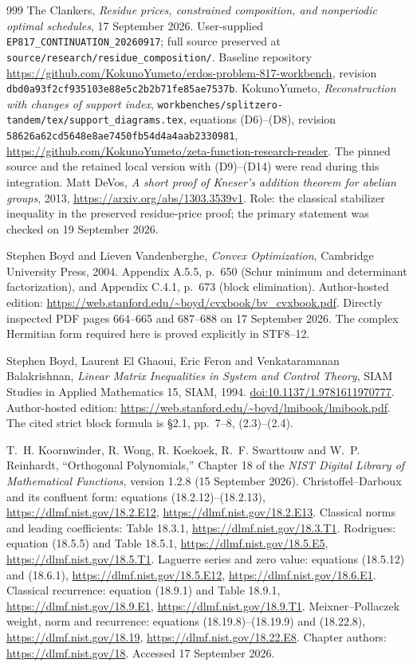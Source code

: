 \documentclass[11pt,a4paper]{article}
\begin{document}
\begin{thebibliography}{999}
The Clankers, \emph{Residue prices, constrained composition, and nonperiodic
optimal schedules}, 17 September 2026.  User-supplied
\texttt{EP817\_CONTINUATION\_20260917}; full source preserved at
\texttt{source/research/residue\_composition/}.
Baseline repository
\url{https://github.com/KokunoYumeto/erdos-problem-817-workbench},
revision \texttt{dbd0a93f2cf935103e88e5c2b2b71fe85ae7537b}.
KokunoYumeto, \emph{Reconstruction with changes of support index},
\texttt{workbenches/splitzero-tandem/tex/support\_diagrams.tex},
equations (D6)--(D8), revision
\texttt{58626a62cd5648e8ae7450fb54d4a4aab2330981},
\url{https://github.com/KokunoYumeto/zeta-function-research-reader}.
The pinned source and the retained local version with (D9)--(D14) were
read during this integration.
Matt DeVos, \emph{A short proof of Kneser's addition theorem for abelian
groups}, 2013, \url{https://arxiv.org/abs/1303.3539v1}.
Role: the classical stabilizer inequality in the preserved residue-price
proof; the primary statement was checked on 19 September 2026.

Stephen Boyd and Lieven Vandenberghe,
\emph{Convex Optimization}, Cambridge University Press, 2004.
Appendix A.5.5, p.~650 (Schur minimum and determinant factorization),
and Appendix C.4.1, p.~673 (block elimination).
Author-hosted edition: \url{https://web.stanford.edu/~boyd/cvxbook/bv_cvxbook.pdf}.
Directly inspected PDF pages 664--665 and 687--688 on 17 September 2026.
The complex Hermitian form required here is proved explicitly in STF8--12.


Stephen Boyd, Laurent El Ghaoui, Eric Feron and Venkataramanan Balakrishnan,
\emph{Linear Matrix Inequalities in System and Control Theory},
SIAM Studies in Applied Mathematics 15, SIAM, 1994.
\href{https://doi.org/10.1137/1.9781611970777}{doi:10.1137/1.9781611970777}.
Author-hosted edition: \url{https://web.stanford.edu/~boyd/lmibook/lmibook.pdf}.
The cited strict block formula is \S2.1, pp.~7--8, (2.3)--(2.4).


T.~H. Koornwinder, R. Wong, R. Koekoek, R.~F. Swarttouw and
W.~P. Reinhardt,
``Orthogonal Polynomials,'' Chapter 18 of the
\emph{NIST Digital Library of Mathematical Functions},
version 1.2.8 (15 September 2026).
Christoffel--Darboux and its confluent form: equations (18.2.12)--(18.2.13),
\url{https://dlmf.nist.gov/18.2.E12},
\url{https://dlmf.nist.gov/18.2.E13}.
Classical norms and leading coefficients: Table 18.3.1,
\url{https://dlmf.nist.gov/18.3.T1}.
Rodrigues: equation (18.5.5) and Table 18.5.1,
\url{https://dlmf.nist.gov/18.5.E5},
\url{https://dlmf.nist.gov/18.5.T1}.
Laguerre series and zero value: equations (18.5.12) and (18.6.1),
\url{https://dlmf.nist.gov/18.5.E12},
\url{https://dlmf.nist.gov/18.6.E1}.
Classical recurrence: equation (18.9.1) and Table 18.9.1,
\url{https://dlmf.nist.gov/18.9.E1},
\url{https://dlmf.nist.gov/18.9.T1}.
Meixner--Pollaczek weight, norm and recurrence:
equations (18.19.8)--(18.19.9) and (18.22.8),
\url{https://dlmf.nist.gov/18.19},
\url{https://dlmf.nist.gov/18.22.E8}.
Chapter authors: \url{https://dlmf.nist.gov/18}.
Accessed 17 September 2026.



\end{thebibliography}
\end{document}
